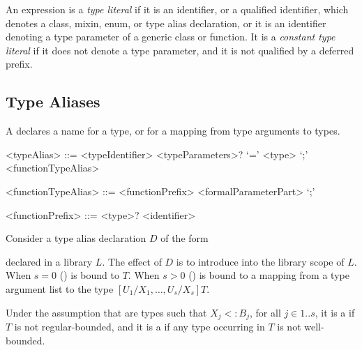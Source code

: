 \documentclass[makeidx]{article}
\begin{document}
\LMHash{}%
An expression is a \emph{type literal} if it is an identifier,
or a qualified identifier,
which denotes a class, mixin, enum, or type alias declaration, or it is
an identifier denoting a type parameter of a generic class or function.
It is a \emph{constant type literal} if it does not denote a type parameter,
and it is not qualified by a deferred prefix.


\subsection{Type Aliases}

\LMHash{}%
A  declares a name for a type,
or for a mapping from type arguments to types.


\begin{grammar}
<typeAlias> ::= \gnewline{}
  \TYPEDEF{} <typeIdentifier> <typeParameters>? `=' <type> `;'
  \alt \TYPEDEF{} <functionTypeAlias>

<functionTypeAlias> ::= <functionPrefix> <formalParameterPart> `;'

<functionPrefix> ::= <type>? <identifier>
\end{grammar}

\LMHash{}%
Consider a type alias declaration $D$ of the form

\noindent
{}

\noindent
declared in a library $L$.
The effect of $D$ is to introduce \id{} into the library scope of $L$.
When $s = 0$
()
\id{} is bound to $T$.
When $s > 0$
()
\id{} is bound to a mapping from a type argument list
to the type
$[U_1/X_1, \ldots, U_s/X_s]T$.

\LMHash{}%
Under the assumption that  are types such that
$X_j <: B_j$, for all $j \in 1 .. s$,
it is a  if $T$ is not regular-bounded,
and it is a
 if any type occurring in $T$ is not well-bounded.

\end{document}
